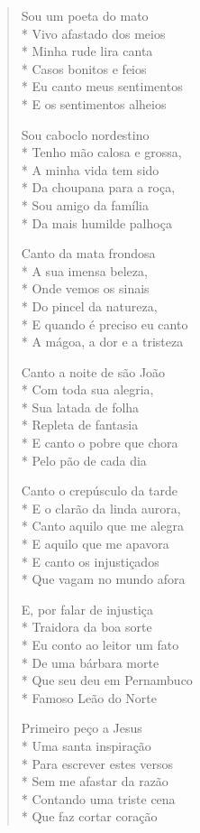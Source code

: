 \begin{verse}
Sou um poeta do mato\\*
Vivo afastado dos meios\\*
Minha rude lira canta\\*
Casos bonitos e feios\\*
Eu canto meus sentimentos\\*
E os sentimentos alheios

Sou caboclo nordestino\\*
Tenho mão calosa e grossa,\\*
A minha vida tem sido\\*
Da choupana para a roça,\\*
Sou amigo da família\\*
Da mais humilde palhoça

Canto da mata frondosa\\*
A sua imensa beleza,\\*
Onde vemos os sinais\\*
Do pincel da natureza,\\*
E quando é preciso eu canto\\*
A mágoa, a dor e a tristeza

Canto a noite de são João\\*
Com toda sua alegria,\\*
Sua latada de folha\\*
Repleta de fantasia\\*
E canto o pobre que chora\\*
Pelo pão de cada dia

Canto o crepúsculo da tarde\\*
E o clarão da linda aurora,\\*
Canto aquilo que me alegra\\*
E aquilo que me apavora\\*
E canto os injustiçados\\*
Que vagam no mundo afora

E, por falar de injustiça\\*
Traidora da boa sorte\\*
Eu conto ao leitor um fato\\*
De uma bárbara morte\\*
Que seu deu em Pernambuco\\*
Famoso Leão do Norte

Primeiro peço a Jesus\\*
Uma santa inspiração\\*
Para escrever estes versos\\*
Sem me afastar da razão\\*
Contando uma triste cena\\*
Que faz cortar coração


\end{verse}
